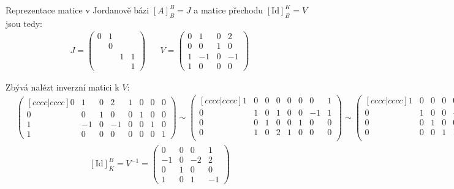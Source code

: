 \documentclass[]{article}
\newcommand{\Id}[2]{\ensuremath{[\mathrm{Id}]_{#1}^{#2}}}
\begin{document}
\medskip
\medskip

Reprezentace matice v Jordanově bázi $[A]_B^B = J$ a matice přechodu $\Id{B}{K} = V$ jsou tedy:
\begin{align*}
    J =
    \begin{pmatrix}
        0 & 1 \\
          & 0 \\
          &   & 1 & 1 \\
          &   &   & 1
    \end{pmatrix}
    \;\;\;\;\;\;
    V =
    \begin{pmatrix}
        0 & 1 & 0 & 2\\
        0 & 0 & 1 & 0\\
        1 &-1 & 0 & -1\\
        1 & 0 & 0 & 0
    \end{pmatrix}
\end{align*}

\medskip
\medskip

Zbývá nalézt inverzní matici k $V$:
\begin{align*}
    &
    \begin{pmatrix}[cccc|cccc]
        0 & 1 & 0 & 2  &  1 & 0 & 0 & 0 \\
        0 & 0 & 1 & 0  &  0 & 1 & 0 & 0 \\
        1 &-1 & 0 &-1  &  0 & 0 & 1 & 0 \\
        1 & 0 & 0 & 0  &  0 & 0 & 0 & 1
    \end{pmatrix} \sim
    \begin{pmatrix}[cccc|cccc]
        1 & 0 & 0 & 0  &  0 & 0 & 0 & 1 \\
        0 & 1 & 0 & 1  &  0 & 0 &-1 & 1 \\
        0 & 0 & 1 & 0  &  0 & 1 & 0 & 0 \\
        0 & 1 & 0 & 2  &  1 & 0 & 0 & 0 \\
    \end{pmatrix} \sim
    \begin{pmatrix}[cccc|cccc]
        1 & 0 & 0 & 0  &  0 & 0 & 0 & 1 \\
        0 & 1 & 0 & 0  & -1 & 0 &-2 & 2 \\
        0 & 0 & 1 & 0  &  0 & 1 & 0 & 0 \\
        0 & 0 & 0 & 1  &  1 & 0 & 1 &-1 \\
    \end{pmatrix}
\end{align*}
\begin{align*}
    \Id{K}{B} = 
    V^{-1} =
    \begin{pmatrix}
        0 & 0 & 0 & 1 \\
       -1 & 0 &-2 & 2 \\
        0 & 1 & 0 & 0 \\
        1 & 0 & 1 &-1
    \end{pmatrix}
\end{align*}
\end{document}
